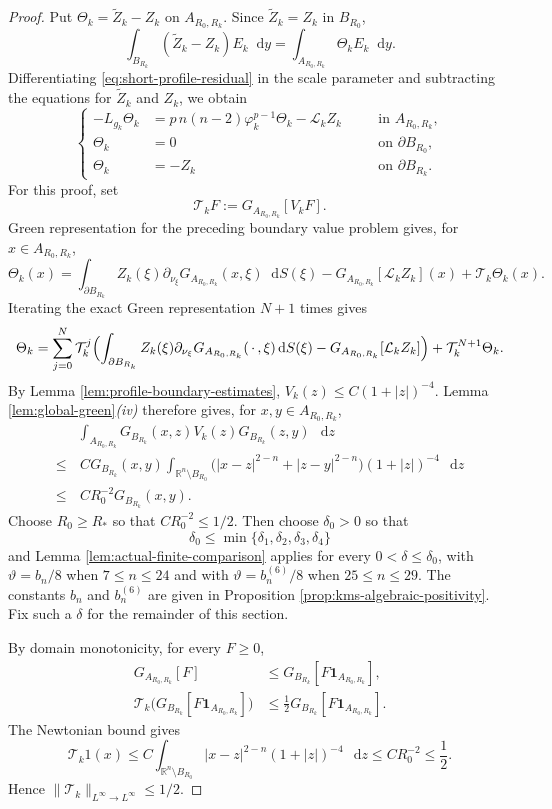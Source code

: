 \documentclass[11pt]{article}
\numberwithin{equation}{section}
\theoremstyle{remark}
\newcommand{\R}{\mathbb R}
\newcommand{\dd}{\mathop{}\!\mathrm{d}}
\begin{document}
\begin{proof}
 Put $\Theta_k=\widetilde Z_k-Z_k$ on  $A_{R_0,R_k}$.  Since
$\widetilde Z_k=Z_k$ in $B_{R_0}$,
{
\[
 \int_{B_{R_k}}(\widetilde Z_k-Z_k)E_k\dd y
 =\int_{A_{R_0,R_k}}\Theta_kE_k\dd y.
\]
}
 Differentiating \eqref{eq:short-profile-residual} in the scale parameter
and subtracting the equations for $\widetilde Z_k$ and $Z_k$, we obtain
{
\[
{\left\{\begin{aligned}
 -L_{g_k}\Theta_k
 &=p\,n(n-2)\varphi_k^{p-1}\Theta_k-\mathcal L_kZ_k
 &&\quad\text{in }A_{R_0,R_k},\\
 \Theta_k&=0&&\quad\text{on }\partial B_{R_0},\\
 \Theta_k&=-Z_k&&\quad\text{on }\partial B_{R_k}.
\end{aligned}\right.}
\]
}
 For this proof, set
{
\[
 \mathcal T_kF:=G_{A_{R_0,R_k}}[V_kF].
\]
}
 Green representation for the preceding boundary value problem gives,
for $x\in A_{R_0,R_k}$,
{
\[
 \Theta_k(x)
 =\int_{\partial B_{R_k}}Z_k(\xi)
   \partial_{\nu_\xi}G_{A_{R_0,R_k}}(x,\xi)\dd S(\xi)
   -G_{A_{R_0,R_k}}[\mathcal L_kZ_k](x)
 +\mathcal T_k\Theta_k(x).
\]
}
 Iterating the exact Green representation $N+1$ times gives
{
\[
 \Theta_k
 =\sum_{j=0}^{N}
 \mathcal T_k^j
 \Bigl(
   \int_{\partial B_{R_k}}Z_k(\xi)
   \partial_{\nu_\xi}G_{A_{R_0,R_k}}(\,\cdot\,,\xi)\dd S(\xi)
   -G_{A_{R_0,R_k}}[\mathcal L_kZ_k]
 \Bigr)
 +
 \mathcal T_k^{N+1}\Theta_k.
\]
}
By Lemma  \ref{lem:profile-boundary-estimates},
$V_k(z)\le C(1+|z|)^{-4}$. Lemma  \ref{lem:global-green}\emph{(iv)}
therefore gives, for \(x,y\in A_{R_0,R_k}\),
{
\[
\begin{aligned}
 &\int_{A_{R_0,R_k}}
 G_{B_{R_k}}(x,z)V_k(z)G_{B_{R_k}}(z,y)\,\dd z\\
 \le&\,
 CG_{B_{R_k}}(x,y)
 \int_{\R^n\setminus B_{R_0}}
 \bigl(|x-z|^{2-n}+|z-y|^{2-n}\bigr)
 (1+|z|)^{-4}\,\dd z\\
 \le&\, CR_0^{-2}G_{B_{R_k}}(x,y).
\end{aligned}
\]
}
Choose \(R_0\ge R_*\) so that \(CR_0^{-2}\le1/2\). Then choose
\(\delta_0>0\) so that
\[
 \delta_0\le\min\{\delta_1,\delta_2,\delta_3,\delta_4\}
\]
and Lemma  \ref{lem:actual-finite-comparison} applies for every
\(0<\delta\le\delta_0\), with \(\vartheta=b_n/8\) when
\(7\le n\le24\) and with \(\vartheta=b_n^{(6)}/8\) when
\(25\le n\le29\). The constants \(b_n\) and \(b_n^{(6)}\) are given in
Proposition  \ref{prop:kms-algebraic-positivity}. Fix such a \(\delta\)
for the remainder of this section.

By domain monotonicity, for every \(F\ge0\),
\[
 \begin{aligned}
 G_{A_{R_0,R_k}}[F]
 &\le G_{B_{R_k}}[F\mathbf 1_{A_{R_0,R_k}}],\\
 \mathcal T_k\bigl(G_{B_{R_k}}
 [F\mathbf 1_{A_{R_0,R_k}}]\bigr)
 &\le\frac12G_{B_{R_k}}
 [F\mathbf 1_{A_{R_0,R_k}}].
 \end{aligned}
\]
The Newtonian bound gives
\[
 \mathcal T_k1(x)
 \le C\int_{\R^n\setminus B_{R_0}}
 |x-z|^{2-n}(1+|z|)^{-4}\,\dd z
 \le CR_0^{-2}\le\frac12.
\]
Hence \(\|\mathcal T_k\|_{L^\infty\to L^\infty}\le1/2\).


\end{proof}
\end{document}
